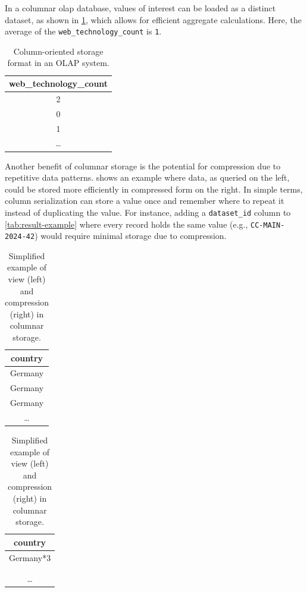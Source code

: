In a columnar \ac{olap} database, values of interest can be loaded as a distinct dataset, as shown in \cref{tab:olap-example}, which allows for efficient aggregate calculations.
Here, the average of the \texttt{web\_technology\_count} is \texttt{1}.

\begin{table}[H]
    \centering
    \begin{tabular}{|c|}
    \hline
    \textbf{web\_technology\_count} \\
    \hline
    2 \\
    \hline
    0 \\
    \hline
    1 \\
    \hline
    … \\
    \hline
    \end{tabular}
    \caption{Column-oriented storage format in an OLAP system.}
    \label{tab:olap-example}
\end{table}

Another benefit of columnar storage is the potential for compression due to repetitive data patterns.
 shows an example where data, as queried on the left, could be stored more efficiently in compressed form on the right.
In simple terms, column serialization can store a value once and remember where to repeat it instead of duplicating the value.
For instance, adding a \texttt{dataset\_id} column to \cref{tab:result-example} where every record holds the same value (e.g., \texttt{CC-MAIN-2024-42}) would require minimal storage due to compression.

\begin{table}[H]
    \centering
    \begin{tabular}{|c|}
    \hline
    \textbf{country} \\
    \hline
    Germany \\
    \hline
    Germany \\
    \hline
    Germany \\
    \hline
    … \\
    \hline
    \end{tabular}
    \begin{tabular}{|c|}
    \hline
    \textbf{country} \\
    \hline
    Germany*3 \\
    \hline
    \\
    \hline
    \\
    \hline
    … \\
    \hline
    \end{tabular}
    \caption{Simplified example of view (left) and compression (right) in columnar storage.}
    \label{tab:compression-example}
\end{table}

